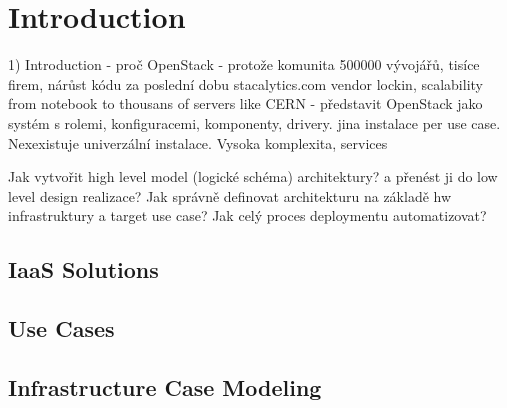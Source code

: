 
\section{Introduction}

1) Introduction 
 - proč OpenStack - protože komunita 500000 vývojářů, tisíce firem, nárůst kódu za poslední dobu stacalytics.com
          vendor lockin, scalability from notebook to thousans of servers like CERN
 - představit OpenStack jako systém s rolemi, konfiguracemi, komponenty, drivery. jina instalace per use case. Nexexistuje univerzální instalace. Vysoka komplexita, services

Jak vytvořit high level model (logické schéma) architektury? a přenést ji do low level design realizace? 
Jak správně definovat architekturu na základě hw infrastruktury a target use case?
Jak celý proces deploymentu automatizovat?

\subsection{IaaS Solutions}

\subsection{Use Cases}

\subsection{Infrastructure Case Modeling}
